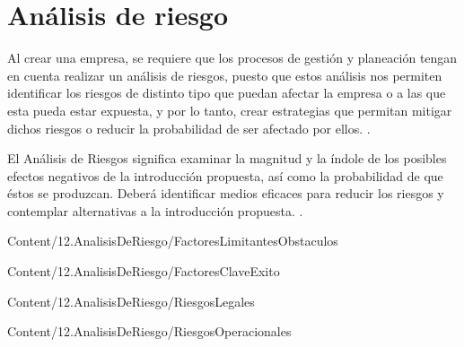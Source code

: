 \section{Análisis de riesgo}

Al crear una empresa, se requiere que los procesos de gestión y planeación tengan en cuenta realizar un análisis de riesgos, puesto que estos análisis nos permiten identificar los riesgos de distinto tipo que puedan afectar la empresa o a las que esta pueda estar expuesta, y por lo tanto, crear estrategias que permitan mitigar dichos riesgos o reducir la probabilidad de ser afectado por ellos. \cite{merchan}.

El Análisis de Riesgos significa examinar la magnitud y la índole de los posibles efectos negativos de la introducción propuesta, así como la probabilidad de que éstos se produzcan. Deberá identificar medios eficaces para reducir los riesgos y contemplar alternativas a la introducción propuesta. \cite{iucn}.

{Content/12.AnalisisDeRiesgo/FactoresLimitantesObstaculos}

{Content/12.AnalisisDeRiesgo/FactoresClaveExito}

{Content/12.AnalisisDeRiesgo/RiesgosLegales}

{Content/12.AnalisisDeRiesgo/RiesgosOperacionales}

